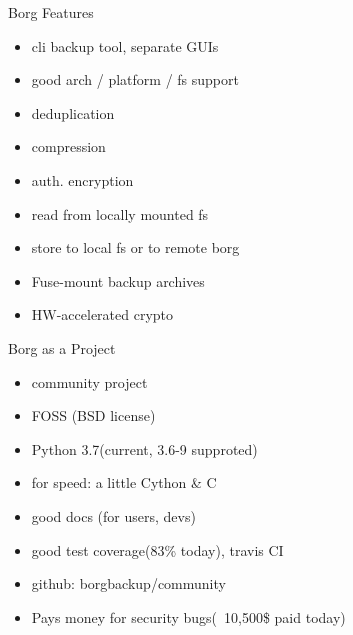 \documentclass{beamer}
\begin{document}
\begin{frame}{Borg Features}
	\begin{itemize}
	\item cli backup tool, separate GUIs

	\item good arch / platform / fs support

	\item deduplication 

	\item compression  

	\item auth. encryption

	\item read from locally mounted fs

	\item store to local fs or to remote borg
	
	\item Fuse-mount backup archives

	\item HW-accelerated crypto
\end{itemize}
\end{frame}

\begin{frame}{Borg as a Project}
	\begin{itemize}
		
	\item community project
	
	\item FOSS  (BSD license)
	
	\item Python 3.7(current, 3.6-9 supproted)
	
	\item for speed:  a little Cython \& C
	
	\item good docs  (for users, devs)
	
	\item good test coverage(83\% today), travis CI
	
	\item github: borgbackup/community
	\item Pays money for security bugs(~10,500\$ paid today)  
\end{itemize}
\end{frame}
\end{document}
